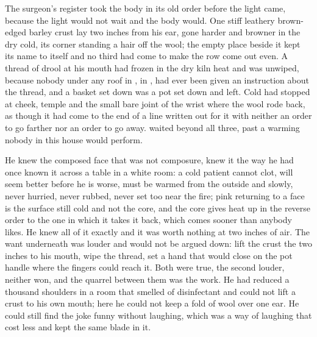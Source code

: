 The surgeon's register took the body in its old order before the light came, because the light would not wait and the body would. One stiff leathery brown-edged barley crust lay two inches from his ear, gone harder and browner in the dry cold, its corner standing a hair off the wool; the empty place beside it kept its name to itself and no third had come to make the row come out even. A thread of drool at his mouth had frozen in the dry kiln heat and was unwiped, because nobody under any roof in , in , had ever been given an instruction about the thread, and a basket set down was a pot set down and left. Cold had stopped at cheek, temple and the small bare joint of the wrist where the wool rode back, as though it had come to the end of a line written out for it with neither an order to go farther nor an order to go away.  waited beyond all three, past a warming nobody in this house would perform.

He knew the composed face that was not composure, knew it the way he had once known it across a table in a white room: a cold patient cannot clot, will seem better before he is worse, must be warmed from the outside and slowly, never hurried, never rubbed, never set too near the fire; pink returning to a face is the surface still cold and not the core, and the core gives heat up in the reverse order to the one in which it takes it back, which comes sooner than anybody likes. He knew all of it exactly and it was worth nothing at two inches of air. The want underneath was louder and would not be argued down: lift the crust the two inches to his mouth, wipe the thread, set a hand that would close on the pot handle where the fingers could reach it. Both were true, the second louder, neither won, and the quarrel between them was the work. He had reduced a thousand shoulders in a room that smelled of disinfectant and could not lift a crust to his own mouth; here he could not keep a fold of wool over one ear. He could still find the joke funny without laughing, which was a way of laughing that cost less and kept the same blade in it.

\scenebreak

